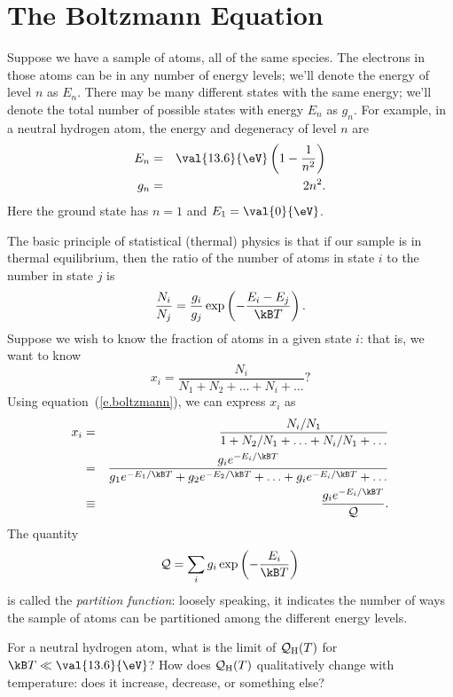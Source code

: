 
\section{The Boltzmann Equation}
\label{s.boltzmann-eqn}

Suppose we have a sample of atoms, all of the same species.  The electrons in those atoms can be in any number of energy levels; we'll denote the energy of level $n$ as $E_{n}$.  There may be many different states with the same energy; we'll denote the total number of possible states with energy $E_{n}$ as $g_{n}$.  For example, in a neutral hydrogen atom, the energy and degeneracy of level $n$ are
\begin{eqnarray*}
 E_{n} &=& \val{13.6}{\eV}\left(1-\frac{1}{n^{2}}\right)\\
 g_{n} &=& 2n^{2}.
\end{eqnarray*}
Here the ground state has $n = 1$ and $E_{1} = \val{0}{\eV}$.

The basic principle of statistical (thermal) physics is that if our sample is in thermal equilibrium, then the ratio of the number of atoms in state $i$ to the number in state $j$ is
\begin{equation}\label{e.boltzmann}
\frac{N_{i}}{N_{j}} = \frac{g_{i}}{g_{j}} 
\exp\left(-\frac{E_{i}-E_{j}}{\kB T}\right).
\end{equation}
Suppose we wish to know the fraction of atoms in a given state $i$: that is, we want to know
\[	x_{i} = \frac{N_{i}}{N_{1}+N_{2}+\ldots+N_{i}+\ldots} ? \]
Using equation~(\ref{e.boltzmann}), we can express $x_{i}$ as 
\begin{eqnarray}
  x_{i} &=& \frac{N_{i}/N_{1}}{1+N_{2}/N_{1}+\ldots+N_{i}/N_{1}+\ldots}\nonumber\\
        &=& \frac{g_{i}e^{-E_{i}/\kB T}}{g_{1}e^{-E_{1}/\kB T}+g_{2}e^{-E_{2}/\kB T}+\ldots+g_{i}e^{-E_{i}/\kB T}+\ldots} \nonumber\\
        &\equiv& \frac{g_{i}e^{-E_{i}/\kB T}}{\pfcn}.
\end{eqnarray}
The quantity 
\[ \pfcn = \sum_{i} g_{i}\exp\left(-\frac{E_{i}}{\kB T}\right) \]
is called the \emph{partition function}: loosely speaking, it indicates the number of ways the sample of atoms can be partitioned among the different energy levels.

\begin{exercisebox}
For a neutral hydrogen atom, what is the limit of $\mathcal{Q}_{\mathrm{H}}(T)$ for $\kB T \ll \val{13.6}{\eV}$?  How does $\mathcal{Q}_{\mathrm{H}}(T)$ qualitatively change with temperature: does it increase, decrease, or something else?
\end{exercisebox}

